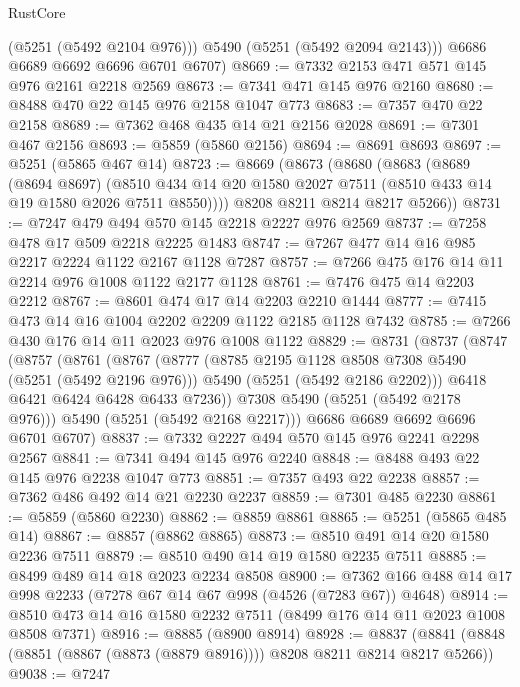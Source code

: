 \begin{lexlean}{RustCore}
\begin{coremodule}
          (@5251 (@5492 @2104 @976)))
        @5490
        (@5251 (@5492 @2094 @2143)))
      @6686
      @6689
      @6692
      @6696
      @6701
      @6707)
@8669 := @7332 @2153 @471 @571 @145 @976 @2161 @2218 @2569
@8673 := @7341 @471 @145 @976 @2160
@8680 := @8488 @470 @22 @145 @976 @2158 @1047 @773
@8683 := @7357 @470 @22 @2158
@8689 := @7362 @468 @435 @14 @21 @2156 @2028
@8691 := @7301 @467 @2156
@8693 := @5859 (@5860 @2156)
@8694 := @8691 @8693
@8697 := @5251 (@5865 @467 @14)
@8723 := @8669
    (@8673
      (@8680
        (@8683
          (@8689
            (@8694 @8697)
            (@8510 @434 @14 @20 @1580 @2027 @7511 (@8510 @433 @14 @19 @1580 @2026 @7511 @8550))))
        @8208
        @8211
        @8214
        @8217
        @5266))
@8731 := @7247 @479 @494 @570 @145 @2218 @2227 @976 @2569
@8737 := @7258 @478 @17 @509 @2218 @2225 @1483
@8747 := @7267 @477 @14 @16 @985 @2217 @2224 @1122 @2167 @1128 @7287
@8757 := @7266 @475 @176 @14 @11 @2214 @976 @1008 @1122 @2177 @1128
@8761 := @7476 @475 @14 @2203 @2212
@8767 := @8601 @474 @17 @14 @2203 @2210 @1444
@8777 := @7415 @473 @14 @16 @1004 @2202 @2209 @1122 @2185 @1128 @7432
@8785 := @7266 @430 @176 @14 @11 @2023 @976 @1008 @1122
@8829 := @8731
    (@8737
      (@8747
        (@8757
          (@8761
            (@8767
              (@8777
                (@8785 @2195 @1128 @8508 @7308 @5490 (@5251 (@5492 @2196 @976)))
                @5490
                (@5251 (@5492 @2186 @2202)))
              @6418
              @6421
              @6424
              @6428
              @6433
              @7236))
          @7308
          @5490
          (@5251 (@5492 @2178 @976)))
        @5490
        (@5251 (@5492 @2168 @2217)))
      @6686
      @6689
      @6692
      @6696
      @6701
      @6707)
@8837 := @7332 @2227 @494 @570 @145 @976 @2241 @2298 @2567
@8841 := @7341 @494 @145 @976 @2240
@8848 := @8488 @493 @22 @145 @976 @2238 @1047 @773
@8851 := @7357 @493 @22 @2238
@8857 := @7362 @486 @492 @14 @21 @2230 @2237
@8859 := @7301 @485 @2230
@8861 := @5859 (@5860 @2230)
@8862 := @8859 @8861
@8865 := @5251 (@5865 @485 @14)
@8867 := @8857 (@8862 @8865)
@8873 := @8510 @491 @14 @20 @1580 @2236 @7511
@8879 := @8510 @490 @14 @19 @1580 @2235 @7511
@8885 := @8499 @489 @14 @18 @2023 @2234 @8508
@8900 := @7362 @166 @488 @14 @17 @998 @2233 (@7278 @67 @14 @67 @998 (@4526 (@7283 @67)) @4648)
@8914 := @8510 @473 @14 @16 @1580 @2232 @7511 (@8499 @176 @14 @11 @2023 @1008 @8508 @7371)
@8916 := @8885 (@8900 @8914)
@8928 := @8837 (@8841 (@8848 (@8851 (@8867 (@8873 (@8879 @8916)))) @8208 @8211 @8214 @8217 @5266))
@9038 := @7247

\end{coremodule}
\end{lexlean}
